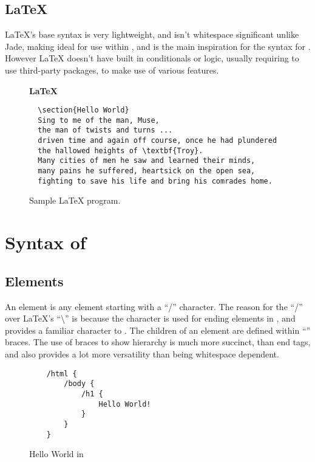 \subsection{\LaTeX{}}

\LaTeX{}'s base syntax is very lightweight, and isn't whitespace significant unlike Jade, making ideal for use within , and is the main inspiration for the syntax for \languageName{}. However \LaTeX{} doesn't have built in conditionals or logic, usually requiring \you{} to use third-party packages, to make use of various features.

\begin{figure}[!htbp]
  \Large{\textbf{\LaTeX{}}}\normalsize{}
  \begin{verbatim}
  \section{Hello World}
  Sing to me of the man, Muse, 
  the man of twists and turns ... 
  driven time and again off course, once he had plundered 
  the hallowed heights of \textbf{Troy}. 
  Many cities of men he saw and learned their minds, 
  many pains he suffered, heartsick on the open sea, 
  fighting to save his life and bring his comrades home.
  \end{verbatim}
  \caption{Sample \LaTeX{} program.}
\end{figure}
\newpage

\section{Syntax of \languageName{}}

\subsection{Elements}
An element is any element starting with a ``/'' character. The reason for the ``/'' over \LaTeX{}'s ``\textbackslash'' is because the character is used for ending elements in , and provides a familiar character to \you{}. The children of an element are defined within ``{}'' braces. The use of braces to show hierarchy is much more succinct, than  end tags, and also provides a lot more versatility than being whitespace dependent.

\begin{figure}[!htbp]
    \Large{\textbf{\languageName{}}}\normalsize{}
    \begin{verbatim}
    /html {
        /body {
            /h1 {
                Hello World!
            }
        }
    }
  \end{verbatim}
  \caption{Hello World in \languageName{}}
\end{figure}
\newpage
